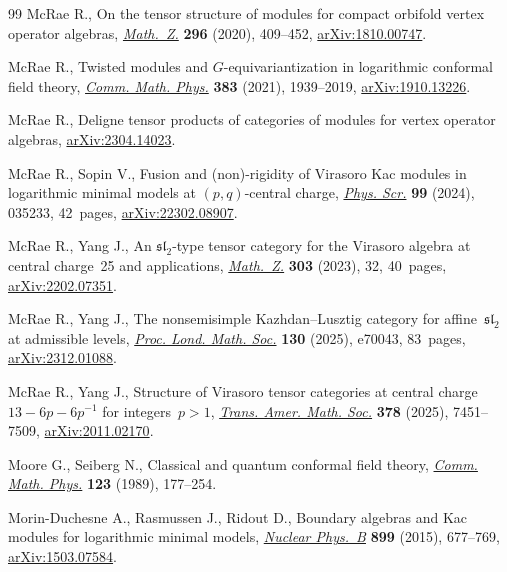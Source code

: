 \documentclass[pdftex]{sigma}
\numberwithin{equation}{section}
\theoremstyle{definition}
\begin{document}
\begin{thebibliography}{99}
McRae R., On the tensor structure of modules for compact orbifold vertex
 operator algebras,
 \href{https://doi.org/10.1007/s00209-019-02445-z}{\textit{Math.~Z.}}
 \textbf{296} (2020), 409--452,
 \href{http://arxiv.org/abs/1810.00747}{arXiv:1810.00747}.

McRae R., Twisted modules and $G$-equivariantization in logarithmic conformal
 field theory, \href{https://doi.org/10.1007/s00220-020-03882-2}{\textit{Comm.
 Math. Phys.}} \textbf{383} (2021), 1939--2019,
 \href{http://arxiv.org/abs/1910.13226}{arXiv:1910.13226}.

McRae R., Deligne tensor products of categories of modules for vertex operator
 algebras, \href{http://arxiv.org/abs/2304.14023}{arXiv:2304.14023}.

McRae R., Sopin V., Fusion and (non)-rigidity of {V}irasoro {K}ac modules in
 logarithmic minimal models at $(p,q)$-central charge,
 \href{https://doi.org/10.1088/1402-4896/ad23aa}{\textit{Phys. Scr.}}
 \textbf{99} (2024), 035233, 42~pages,
 \href{http://arxiv.org/abs/22302.08907}{arXiv:22302.08907}.

McRae R., Yang J., An {$\mathfrak{sl}_2$}-type tensor category for the
 {V}irasoro algebra at central charge~25 and applications,
 \href{https://doi.org/10.1007/s00209-022-03197-z}{\textit{Math.~Z.}}
 \textbf{303} (2023), 32, 40~pages,
 \href{http://arxiv.org/abs/2202.07351}{arXiv:2202.07351}.

McRae R., Yang J., The nonsemisimple {K}azhdan--{L}usztig category for
 affine~{$\mathfrak{sl}_2$} at admissible levels,
 \href{https://doi.org/10.1112/plms.70043}{\textit{Proc. Lond. Math. Soc.}}
 \textbf{130} (2025), e70043, 83~pages,
 \href{http://arxiv.org/abs/2312.01088}{arXiv:2312.01088}.

McRae R., Yang J., Structure of {V}irasoro tensor categories at central
 charge~{$13-6p-6p^{-1}$} for integers~{$p>1$},
 \href{https://doi.org/10.1090/tran/9449}{\textit{Trans. Amer. Math. Soc.}}
 \textbf{378} (2025), 7451--7509,
 \href{http://arxiv.org/abs/2011.02170}{arXiv:2011.02170}.

Moore G., Seiberg N., Classical and quantum conformal field theory,
 \href{https://doi.org/10.1007/BF01238857}{\textit{Comm. Math. Phys.}}
 \textbf{123} (1989), 177--254.

Morin-Duchesne A., Rasmussen J., Ridout D., Boundary algebras and {K}ac modules
 for logarithmic minimal models,
 \href{https://doi.org/10.1016/j.nuclphysb.2015.08.017}{\textit{Nuclear
 Phys.~B}} \textbf{899} (2015), 677--769,
 \href{http://arxiv.org/abs/1503.07584}{arXiv:1503.07584}.


\end{thebibliography}
\end{document}
